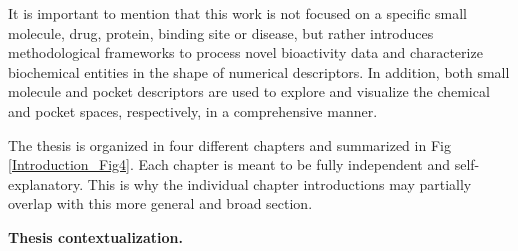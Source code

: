 It is important to mention that this work is not focused on a specific small molecule, drug, protein, binding site or disease, but rather introduces methodological frameworks to process novel bioactivity data and characterize biochemical entities in the shape of numerical descriptors. In addition, both small molecule and pocket descriptors are used to explore and visualize the chemical and pocket spaces, respectively, in a comprehensive manner. 

The thesis is organized in four different chapters and summarized in Fig \ref{Introduction_Fig4}. Each chapter is meant to be fully independent and self-explanatory. This is why the individual chapter introductions may partially overlap with this more general and broad section. 

\begin{Figure_modified}
  \centering
  \vspace{-15mm}
  \caption{
    \textbf{Thesis contextualization.} 
}
\end{Figure_modified}
